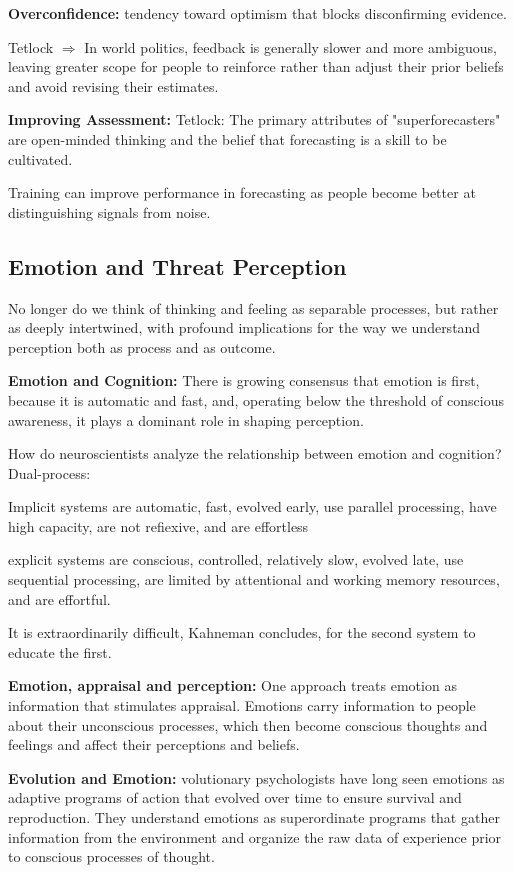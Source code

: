 \textbf{Overconfidence:} tendency toward optimism that blocks disconfirming evidence.

Tetlock $\Rightarrow$ In world politics, feedback is generally slower and more ambiguous, leaving greater scope for people to reinforce rather than adjust their prior beliefs and avoid revising their estimates.

\textbf{Improving Assessment:} 
Tetlock: The primary attributes of "superforecasters" are open-minded thinking and the belief that forecasting is a skill to be cultivated.

Training can improve performance in forecasting as people become better at distinguishing signals from noise.

\subsection{Emotion and Threat Perception}
No longer do we think of thinking and feeling as separable processes, but rather as deeply intertwined, with profound implications for the way we understand perception both as process and as outcome.

\textbf{Emotion and Cognition:} There is growing consensus that emotion is first, because it is automatic and fast, and, operating below the threshold of conscious awareness, it plays a dominant role in shaping perception.

How do neuroscientists analyze the relationship between emotion and cognition? Dual-process:

Implicit systems are automatic, fast, evolved early, use parallel processing, have high capacity, are not refiexive, and are effortless

explicit systems are conscious, controlled, relatively slow, evolved late, use sequential processing, are limited by attentional and working memory resources, and are effortful.

It is extraordinarily difficult, Kahneman concludes, for the second system to educate the first.

\textbf{Emotion, appraisal and perception:} One approach treats emotion as information that stimulates appraisal. Emotions carry information to people about their unconscious processes, which then become conscious thoughts and feelings and affect their perceptions and beliefs.

\textbf{Evolution and Emotion:} volutionary psychologists have long seen emotions as adaptive programs of action that evolved over time to ensure survival and reproduction. They understand emotions as superordinate programs that gather information from the environment and organize the raw data of experience prior to conscious processes of thought.

